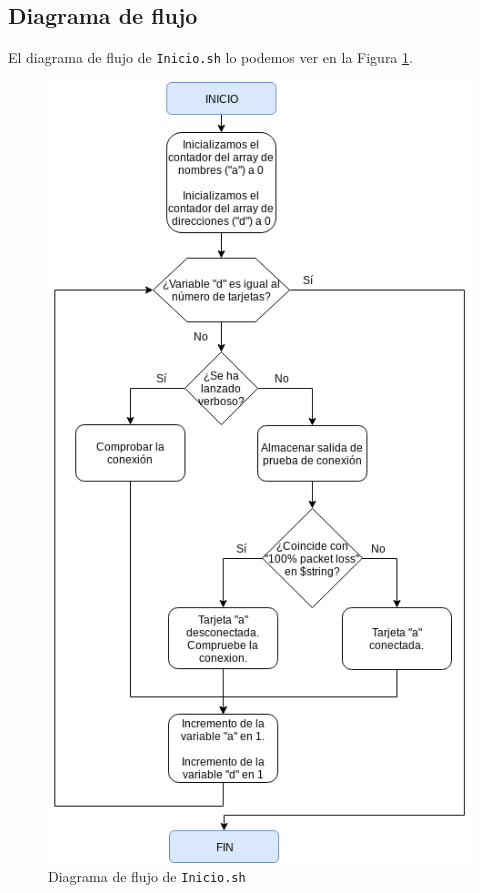\subsection{Diagrama de flujo}
El diagrama de flujo de \texttt{Inicio.sh} lo podemos ver en la Figura \ref{Diagrama de flujo de Inicio.sh}.
\begin{figure}[h]
	\centering
	\includegraphics[scale=0.562]{Anexos/Anexo2/Test/Inicio.png}
	\caption{Diagrama de flujo de \texttt{Inicio.sh}}
	\label{Diagrama de flujo de Inicio.sh}
\end{figure}

